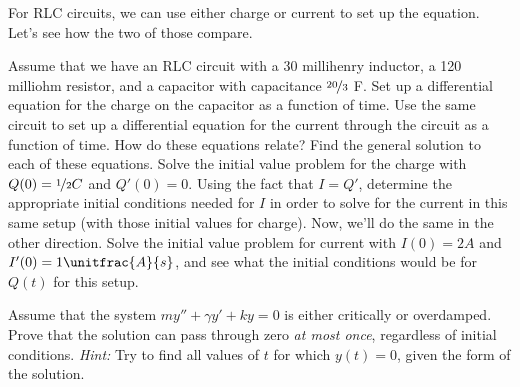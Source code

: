 \begin{exercise}
For RLC circuits, we can use either charge or current to set up the equation. Let's see how the two of those compare.
\begin{tasks}
\task Assume that we have an RLC circuit with a 30 millihenry inductor, a 120 milliohm resistor, and a capacitor with capacitance $\nicefrac{20}{3}$ F. Set up a differential equation for the charge on the capacitor as a function of time.
\task Use the same circuit to set up a differential equation for the current through the circuit as a function of time. How do these equations relate?
\task Find the general solution to each of these equations. 
\task Solve the initial value problem for the charge with $Q(0) = \nicefrac{1}{2} C$ and $Q'(0) = 0$.
\task Using the fact that $I = Q'$, determine the appropriate initial conditions needed for $I$ in order to solve for the current in this same setup (with those initial values for charge).
\task Now, we'll do the same in the other direction. Solve the initial value problem for current with $I(0) = 2 A$ and $I'(0) = 1 \unitfrac{A}{s}$, and see what the initial conditions would be for $Q(t)$ for this setup.    
\end{tasks}
\end{exercise}

\begin{exercise}
Assume that the system $my'' + \gamma y' + ky = 0$ is either critically or overdamped. Prove that the solution can pass through zero \emph{at most once}, regardless of initial conditions. \emph{Hint:} Try to find all values of $t$ for which $y(t) = 0$, given the form of the solution.
\end{exercise}

\setcounter{exercise}{100}


